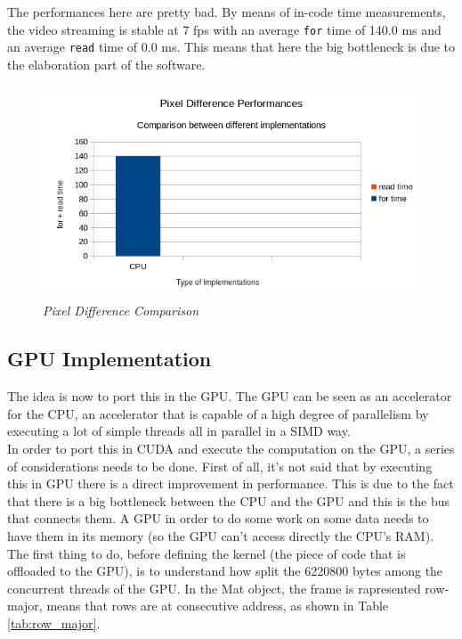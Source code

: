 \documentclass[paper=a4, fontsize=10pt]{scrartcl}	%
\begin{document}
	The performances here are pretty bad. By means of in-code time measurements, the video streaming is stable at 7 fps with an average \texttt{for} time of 140.0 ms and an average \texttt{read} time of 0.0 ms. This means that here the big bottleneck is due to the elaboration part of the software.

	\begin{figure}[H]
		\centering
		\includegraphics[width=0.8\linewidth]{images/chart1.png}
		\caption{\textit{Pixel Difference Comparison}}
	\end{figure}

	\subsection{GPU Implementation}
	The idea is now to port this in the GPU. The GPU can be seen as an accelerator for the CPU, an accelerator that is capable of a high degree of parallelism by executing a lot of simple threads all in parallel in a SIMD way.\\

	In order to port this in CUDA and execute the computation on the GPU, a series of considerations needs to be done. First of all, it's not said that by executing this in GPU there is a direct improvement in performance. This is due to the fact that there is a big bottleneck between the CPU and the GPU and this is the bus that connects them. A GPU in order to do some work on some data needs to have them in its memory (so the GPU can't access directly the CPU's RAM).\\

	The first thing to do, before defining the kernel (the piece of code that is offloaded to the GPU), is to understand how split the 6220800 bytes among the concurrent threads of the GPU. In the Mat object, the frame is rapresented row-major, means that rows are at consecutive address, as shown in Table \ref{tab:row_major}.
\end{document}
